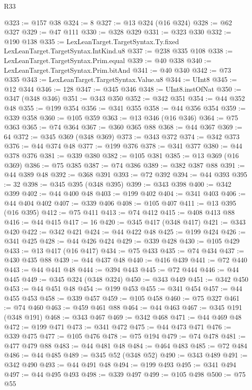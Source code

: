 \begin{lexlean}{R33}
\begin{coremodule}
@323 := @157 @38
@324 := 8
@327 := @13 @324 (@16 @324)
@328 := @62 @327
@329 := @47 @111
@330 := @328 @329
@331 := @323 @330
@332 := @190 @138
@335 := LexLeanTarget.TargetSyntax.Ty.fixed LexLeanTarget.TargetSyntax.IntKind.u8
@337 := @238 @335 @108
@338 := LexLeanTarget.TargetSyntax.Prim.equal
@339 := @40 @338
@340 := LexLeanTarget.TargetSyntax.Prim.bitAnd
@341 := @40 @340
@342 := @73 @335
@343 := LexLeanTarget.TargetSyntax.Value.u8
@344 := UInt8
@345 := @12 @344
@346 := 128
@347 := @345 @346
@348 := UInt8.instOfNat
@350 := @347 (@348 @346)
@351 := @343 @350
@352 := @342 @351
@354 := @44 @352 @48
@355 := @199 @354
@356 := @341 @355
@358 := @44 @356 @354
@359 := @339 @358
@360 := @105 @359
@363 := @13 @346 (@16 @346)
@364 := @75 @363
@365 := @74 @364
@367 := @360 @365 @88
@368 := @44 @367
@369 := 64
@372 := @345 @369 (@348 @369)
@373 := @343 @372
@374 := @342 @373
@376 := @44 @374 @48
@377 := @199 @376
@378 := @341 @377
@380 := @44 @378 @376
@381 := @339 @380
@382 := @105 @381
@385 := @13 @369 (@16 @369)
@386 := @75 @385
@387 := @74 @386
@389 := @382 @387 @88
@391 := @44 @389 @48
@392 := @368 @391
@393 := @72 @392
@394 := @44 @393
@395 := 32
@398 := @345 @395 (@348 @395)
@399 := @343 @398
@400 := @342 @399
@402 := @44 @400 @48
@403 := @199 @402
@404 := @341 @403
@406 := @44 @404 @402
@407 := @339 @406
@408 := @105 @407
@411 := @13 @395 (@16 @395)
@412 := @75 @411
@413 := @74 @412
@415 := @408 @413 @88
@416 := @44 @415
@417 := 16
@420 := @345 @417 (@348 @417)
@421 := @343 @420
@422 := @342 @421
@424 := @44 @422 @48
@425 := @199 @424
@426 := @341 @425
@428 := @44 @426 @424
@429 := @339 @428
@430 := @105 @429
@433 := @13 @417 (@16 @417)
@434 := @75 @433
@435 := @74 @434
@437 := @430 @435 @88
@439 := @44 @437 @48
@440 := @416 @439
@441 := @72 @440
@443 := @44 @441 @48
@444 := @394 @443
@445 := @72 @444
@446 := @44 @445
@449 := @345 @324 (@348 @324)
@450 := @343 @449
@451 := @342 @450
@453 := @44 @451 @48
@454 := @199 @453
@455 := @341 @454
@457 := @44 @455 @453
@458 := @339 @457
@459 := @105 @458
@460 := @75 @327
@461 := @74 @460
@463 := @459 @461 @88
@464 := @44 @463
@467 := @345 @191 (@348 @191)
@468 := @343 @467
@469 := @342 @468
@471 := @44 @469 @48
@472 := @199 @471
@473 := @341 @472
@475 := @44 @473 @471
@476 := @339 @475
@477 := @105 @476
@478 := @75 @194
@479 := @74 @478
@481 := @477 @479 @88
@483 := @44 @481 @48
@484 := @464 @483
@485 := @72 @484
@486 := @44 @485
@489 := @345 @52 (@348 @52)
@490 := @343 @489
@491 := @342 @490
@493 := @44 @491 @48
@494 := @199 @493
@495 := @341 @494
@497 := @44 @495 @493
@498 := @339 @497
@499 := @105 @498
@500 := @75 @55

\end{coremodule}
\end{lexlean}

